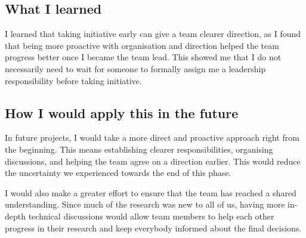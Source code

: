 \documentclass{article}
\begin{document}
\subsection*{What I learned}

I learned that taking initiative early can give a team clearer direction, as I found that being more proactive with organisation and direction helped the team progress better once I became the team lead. This showed me that I do not necessarily need to wait for someone to formally assign me a leadership responsibility before taking initiative.

\subsection*{How I would apply this in the future}

In future projects, I would take a more direct and proactive approach right from the beginning. This means establishing clearer responsibilities, organising discussions, and helping the team agree on a direction earlier. This would reduce the uncertainty we experienced towards the end of this phase.

I would also make a greater effort to ensure that the team has reached a shared understanding. Since much of the research was new to all of us, having more in-depth technical discussions would allow team members to help each other progress in their research and keep everybody informed about the final decisions.

\end{document}
